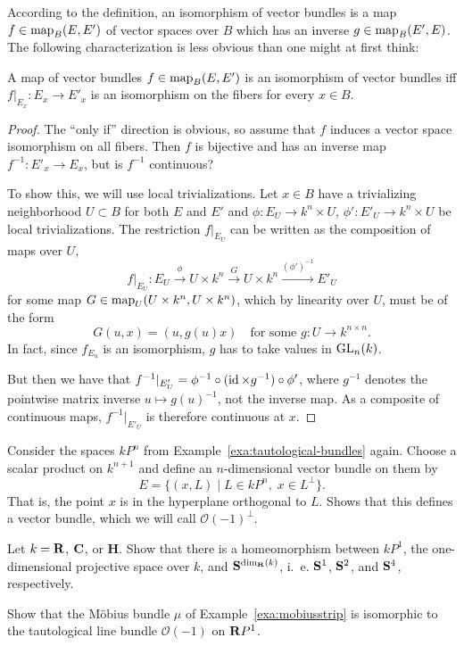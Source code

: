 \documentclass[a4paper,openany]{scrbook}
\begin{document}
According to the definition, an isomorphism of vector bundles is a map $f\in \map_B(E,E')$ of vector spaces over $B$ which has an inverse $g\in \map_B(E',E)$. The following characterization is less obvious than one might at first think:

\begin{thm} \label{thm:fiberwiseiso}
A map of vector bundles $f\in \map_B(E,E')$ is an isomorphism of vector bundles iff $f|_{E_x}\colon E_x \to E'_x$ is an isomorphism on the fibers for every $x \in B$.
\end{thm}
\begin{proof}
The “only if” direction is obvious, so assume that $f$ induces a vector space isomorphism on all fibers. Then $f$ is bijective and has an inverse map $f^{-1}\colon E'_x \to E_x$, but is $f^{-1}$ continuous?

To show this, we will use local trivializations. Let $x \in B$ have a trivializing neighborhood $U \subset B$ for both $E$ and $E'$ and $\phi\colon E_U \to k^n \times U$, $\phi'\colon E'_U \to k^n \times U$ be local trivializations. The restriction $f|_{E_U}$ can be written as the composition of maps over $U$,
\[
f|_{E_U}\colon E_U \xrightarrow{\phi} U \times k^n \xrightarrow{G} U \times k^n \xrightarrow{(\phi')^{-1}} E'_U
\]
for some map $G \in \map_U(U \times k^n,U \times k^n)$, which by linearity over $U$, must be of the form
\[
G(u,x) = (u,g(u)x) \quad \text{for some $g\colon U \to k^{n \times n}$}.
\]
In fact, since $f_{E_u}$ is an isomorphism, $g$ has to take values in $\GL_n(k)$.

But then we have that $f^{-1}|_{E'_U} = \phi^{-1} \circ (\id \times g^{-1}) \circ \phi'$, where $g^{-1}$ denotes the pointwise matrix inverse $u \mapsto g(u)^{-1}$, not the inverse map. As a composite of continuous maps, $f^{-1}|_{E'_U}$ is therefore continuous at $x$. 
\end{proof}

\begin{exer} \label{exer:complement-of-tautological-bundle}
Consider the spaces $kP^n$ from Example~\ref{exa:tautological-bundles} again. Choose a scalar product on $k^{n+1}$ and define an $n$-dimensional vector bundle on them by
\[
E = \{(x,L) \mid L \in kP^n,\; x \in L^\perp\}.
\]
That is, the point $x$ is in the hyperplane orthogonal to $L$. Shows that this defines a vector bundle, which we will call $\mathcal O(-1)^\perp$.
\end{exer}

\begin{exer}
Let $k=\R$, $\CC$, or $\mathbf H$. Show that there is a homeomorphism between $kP^1$, the one-dimensional projective space over $k$, and $\S^{\dim_\R(k)}$, i.~e. $\S^1$, $\S^2$, and $\S^4$, respectively.

Show that the Möbius bundle $\mu$ of Example~\ref{exa:mobiusstrip} is isomorphic to the tautological line bundle $\mathcal O(-1)$ on $\R P^1$.
\end{exer}
\end{document}
